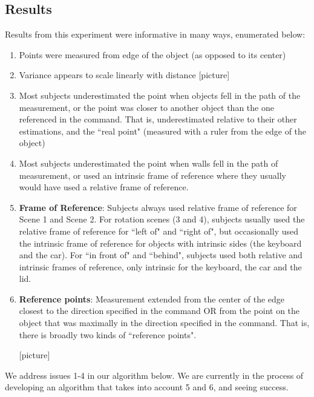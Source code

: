 \documentclass[12pt,letterpaper]{article}
\begin{document}
\subsection{Results}

Results from this experiment were informative in many ways, enumerated below:

\begin{enumerate}[(1)]
\item Points were measured from edge of the object (as opposed to its center)
\item Variance appears to scale linearly with distance [picture]
\item Most subjects underestimated the point when objects fell in the path of the measurement, or the point was closer to another object than the one referenced in the command. That is, underestimated relative to their other estimations, and the ``real point" (measured with a ruler from the edge of the object)

\item Most subjects underestimated the point when walls fell in the path of measurement, or used an intrinsic frame of reference where they usually would have used a relative frame of reference.


\item \textbf{Frame of Reference}: Subjects always used relative frame of reference for Scene 1 and Scene 2. For rotation scenes (3 and 4), subjects usually used the relative frame of reference for ``left of" and ``right of", but occasionally used the intrinsic frame of reference for objects with intrinsic sides (the keyboard and the car). For ``in front of" and ``behind", subjects used both relative and intrinsic frames of reference, only intrinsic for the keyboard, the car and the lid. 

\item \textbf{Reference points}: Measurement extended from the center of the edge closest to the direction specified in the command OR from the point on the object that was maximally in the direction specified in the command. That is, there is broadly two kinds of ``reference points".

[picture]
\end{enumerate}

We address issues 1-4 in our algorithm below. We are currently in the process of developing an algorithm that takes into account 5 and 6, and seeing success.
\end{document}
